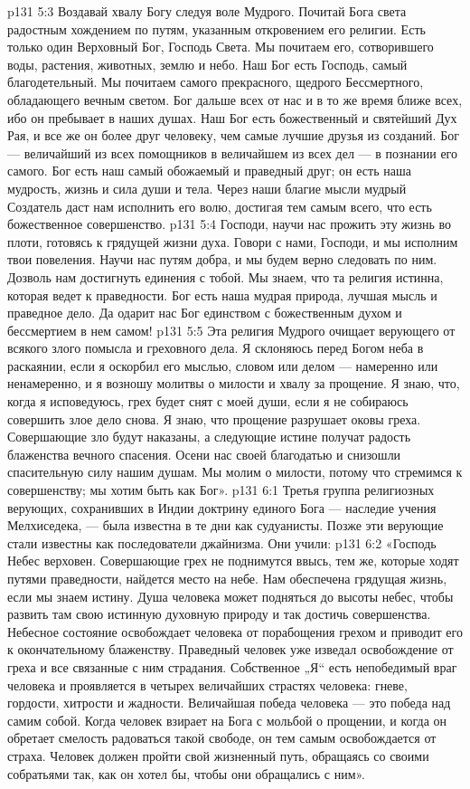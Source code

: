 \vs p131 5:3 Воздавай хвалу Богу следуя воле Мудрого. Почитай Бога света радостным хождением по путям, указанным откровением его религии. Есть только один Верховный Бог, Господь Света. Мы почитаем его, сотворившего воды, растения, животных, землю и небо. Наш Бог есть Господь, самый благодетельный. Мы почитаем самого прекрасного, щедрого Бессмертного, обладающего вечным светом. Бог дальше всех от нас и в то же время ближе всех, ибо он пребывает в наших душах. Наш Бог есть божественный и святейший Дух Рая, и все же он более друг человеку, чем самые лучшие друзья из созданий. Бог --- величайший из всех помощников в величайшем из всех дел --- в познании его самого. Бог есть наш самый обожаемый и праведный друг; он есть наша мудрость, жизнь и сила души и тела. Через наши благие мысли мудрый Создатель даст нам исполнить его волю, достигая тем самым всего, что есть божественное совершенство.
\vs p131 5:4 Господи, научи нас прожить эту жизнь во плоти, готовясь к грядущей жизни духа. Говори с нами, Господи, и мы исполним твои повеления. Научи нас путям добра, и мы будем верно следовать по ним. Дозволь нам достигнуть единения с тобой. Мы знаем, что та религия истинна, которая ведет к праведности. Бог есть наша мудрая природа, лучшая мысль и праведное дело. Да одарит нас Бог единством с божественным духом и бессмертием в нем самом!
\vs p131 5:5 Эта религия Мудрого очищает верующего от всякого злого помысла и греховного дела. Я склоняюсь перед Богом неба в раскаянии, если я оскорбил его мыслью, словом или делом --- намеренно или ненамеренно, и я возношу молитвы о милости и хвалу за прощение. Я знаю, что, когда я исповедуюсь, грех будет снят с моей души, если я не собираюсь совершить злое дело снова. Я знаю, что прощение разрушает оковы греха. Совершающие зло будут наказаны, а следующие истине получат радость блаженства вечного спасения. Осени нас своей благодатью и снизошли спасительную силу нашим душам. Мы молим о милости, потому что стремимся к совершенству; мы хотим быть как Бог».
\vs p131 6:1 Третья группа религиозных верующих, сохранивших в Индии доктрину единого Бога --- наследие учения Мелхиседека, --- была известна в те дни как судуанисты. Позже эти верующие стали известны как последователи джайнизма. Они учили:
\vs p131 6:2 \pc «Господь Небес верховен. Совершающие грех не поднимутся ввысь, тем же, которые ходят путями праведности, найдется место на небе. Нам обеспечена грядущая жизнь, если мы знаем истину. Душа человека может подняться до высоты небес, чтобы развить там свою истинную духовную природу и так достичь совершенства. Небесное состояние освобождает человека от порабощения грехом и приводит его к окончательному блаженству. Праведный человек уже изведал освобождение от греха и все связанные с ним страдания. Собственное „Я“ есть непобедимый враг человека и проявляется в четырех величайших страстях человека: гневе, гордости, хитрости и жадности. Величайшая победа человека --- это победа над самим собой. Когда человек взирает на Бога с мольбой о прощении, и когда он обретает смелость радоваться такой свободе, он тем самым освобождается от страха. Человек должен пройти свой жизненный путь, обращаясь со своими собратьями так, как он хотел бы, чтобы они обращались с ним».

